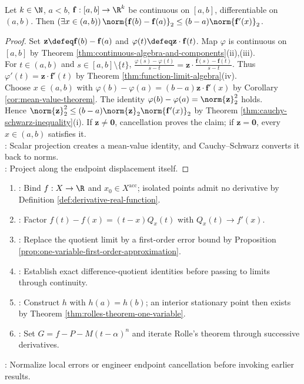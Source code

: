 \begin{theorem} \label{thm:vector-valued-mean-value-inequality} \\
Let $k\in\N$, $a<b$, $\mathbf{f}:[a,b]\to\R^k$ be continuous on $[a,b]$, differentiable on $(a,b)$. Then $(\exists x\in(a,b))\,\norm{\mathbf{f}(b)-\mathbf{f}(a)}_2\leq(b-a)\norm{\mathbf{f}'(x)}_2$.
\begin{proof}
Set $\mathbf{z}\defeq\mathbf{f}(b)-\mathbf{f}(a)$ and $\varphi(t)\defeq\mathbf{z}\cdot\mathbf{f}(t)$. Map $\varphi$ is continuous on $[a,b]$ by Theorem \ref{thm:continuous-algebra-and-components}(ii),(iii).\\
For $t\in(a,b)$ and $s\in[a,b]\setminus\{t\}$, $\frac{\varphi(s)-\varphi(t)}{s-t}=\mathbf{z}\cdot\frac{\mathbf{f}(s)-\mathbf{f}(t)}{s-t}$. Thus $\varphi'(t)=\mathbf{z}\cdot\mathbf{f}'(t)$ by Theorem \ref{thm:function-limit-algebra}(iv).\\
Choose $x\in(a,b)$ with $\varphi(b)-\varphi(a)=(b-a)\mathbf{z}\cdot\mathbf{f}'(x)$ by Corollary \ref{cor:mean-value-theorem}. The identity $\varphi(b)-\varphi(a)=\norm{\mathbf{z}}_2^2$ holds.\\
Hence $\norm{\mathbf{z}}_2^2\leq(b-a)\norm{\mathbf{z}}_2\norm{\mathbf{f}'(x)}_2$ by Theorem \ref{thm:cauchy-schwarz-inequality}(i). If $\mathbf{z}\neq\mathbf{0}$, cancellation proves the claim; if $\mathbf{z}=\mathbf{0}$, every $x\in(a,b)$ satisfies it.\\
: Scalar projection creates a mean-value identity, and Cauchy--Schwarz converts it back to norms.\\
: Project along the endpoint displacement itself.
\end{proof}
\end{theorem}

\begin{proofmethod} \label{meth:one-variable-differentiation-proof-patterns} 
\begin{enumerate}[label=(\roman*)]
\setlength{\itemsep}{0pt}
\item {}: Bind $f:X\to\R$ and $x_0\in X^{\operatorname{acc}}$; isolated points admit no derivative by Definition \ref{def:derivative-real-function}.
\item {}: Factor $f(t)-f(x)=(t-x)Q_x(t)$ with $Q_x(t)\to f'(x)$.
\item {}: Replace the quotient limit by a first-order error bound by Proposition \ref{prop:one-variable-first-order-approximation}.
\item {}: Establish exact difference-quotient identities before passing to limits through continuity.
\item {}: Construct $h$ with $h(a)=h(b)$; an interior stationary point then exists by Theorem \ref{thm:rolles-theorem-one-variable}.
\item {}: Set $G=f-P-M(t-\alpha)^n$ and iterate Rolle's theorem through successive derivatives.
\end{enumerate}
: Normalize local errors or engineer endpoint cancellation before invoking earlier results.
\end{proofmethod}
